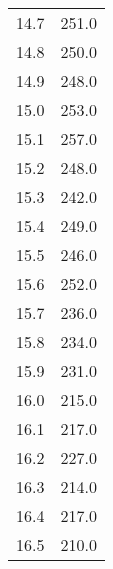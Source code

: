 \begin{table}
{\begin{tabular}{S S}
        14.7 & 251.0 \\
        14.8 & 250.0 \\
        14.9 & 248.0 \\
        15.0 & 253.0 \\
        15.1 & 257.0 \\
        15.2 & 248.0 \\
        15.3 & 242.0 \\
        15.4 & 249.0 \\
        15.5 & 246.0 \\
        15.6 & 252.0 \\
        15.7 & 236.0 \\
        15.8 & 234.0 \\
        15.9 & 231.0 \\
        16.0 & 215.0 \\
        16.1 & 217.0 \\
        16.2 & 227.0 \\
        16.3 & 214.0 \\
        16.4 & 217.0 \\
        16.5 & 210.0 \\
        \bottomrule
    \end{tabular}
    }
\end{table}
